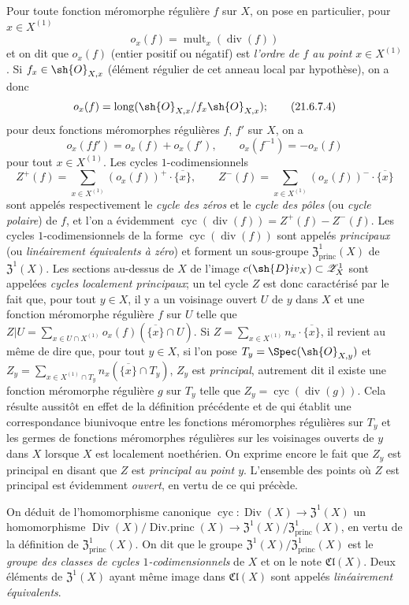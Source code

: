 \begin{env}[21.6.7]
Pour toute fonction méromorphe régulière $f$ sur $X$, on pose en particulier, pour $x\in X^{(1)}$
\[
\label{IV.21.6.7.3}
  o_x(f)=\operatorname{mult}_x(\operatorname{div}(f))
  \tag{21.6.7.3}
\]
et on dit que $o_x(f)$ (entier positif ou négatif) est \emph{l'ordre de $f$ au point} $x\in X^{(1)}$.
Si $f_x\in\sh{O}_{X,x}$ (élément régulier de cet anneau local par hypothèse), on a donc
\[
\label{IV.21.6.7.4}
  o_x(f)=\operatorname{long}(\sh{O}_{X,x}/f_x\sh{O}_{X,x});
  \tag{21.6.7.4}
\]
pour deux fonctions méromorphes régulières $f$, $f'$ sur $X$, on a
\[
\label{IV.21.6.7.5}
  o_x(ff')=o_x(f)+o_x(f'),\qquad o_x(f^{-1})=-o_x(f)
  \tag{21.6.7.5}
\]
pour tout $x\in X^{(1)}$.
Les cycles $1$-codimensionnels
\[
  Z^+(f)=\sum_{x\in X^{(1)}}(o_x(f))^+\cdot\overline{\{x\}},\qquad
  Z^-(f)=\sum_{x\in X^{(1)}}(o_x(f))^-\cdot\overline{\{x\}}
\]
sont appelés respectivement le \emph{cycle des zéros} et le \emph{cycle des pôles} (ou \emph{cycle polaire}) de $f$, et l'on a évidemment $\operatorname{cyc}(\operatorname{div}(f))=Z^+(f)-Z^-(f)$.
Les cycles $1$-codimensionnels de la forme $\operatorname{cyc}(\operatorname{div}(f))$ sont appelés \emph{principaux} (ou \emph{linéairement équivalents à zéro}) et forment un sous-groupe $\mathfrak{Z}^1_\mathrm{princ}(X)$ de $\mathfrak{Z}^1(X)$.
Les sections au-dessus de $X$ de l'image $c(\sh{D}iv_X)\subset\mathscr{Z}_X^1$ sont
appelées \emph{cycles localement principaux};
un tel cycle $Z$ est donc caractérisé par le fait que, pour tout $y\in X$, il y a un voisinage ouvert $U$ de $y$ dans $X$ et une fonction méromorphe régulière $f$ sur $U$ telle que $Z|U=\sum_{x\in U\cap X^{(1)}}o_x(f)(\overline{\{x\}}\cap U)$.
Si $Z=\sum_{x\in X^{(1)}}n_x\cdot\overline{\{x\}}$, il revient au même de dire que, pour tout $y\in X$, si l'on pose $T_y=\Spec(\sh{O}_{X,y})$ et $Z_y=\sum_{x\in X^{(1)}\cap T_y}n_x(\overline{\{x\}}\cap T_y)$, $Z_y$ est \emph{principal}, autrement dit il existe une fonction méromorphe régulière $g$ sur $T_y$ telle que $Z_y=\operatorname{cyc}(\operatorname{div}(g))$.
Cela résulte aussitôt en effet de la définition précédente et de  qui établit une correspondance biunivoque entre les fonctions méromorphes régulières sur $T_y$ et les germes de fonctions méromorphes régulières sur les voisinages ouverts de $y$ dans $X$ lorsque $X$ est localement noethérien.
On exprime encore le fait que $Z_y$ est principal en disant que $Z$ est \emph{principal au point $y$}.
L'ensemble des points où $Z$ est principal est évidemment \emph{ouvert}, en vertu de ce qui précède.

On déduit de l'homomorphisme canonique $\operatorname{cyc}:\operatorname{Div}(X)\to\mathfrak{Z}^1(X)$ un homomorphisme $\operatorname{Div}(X)/\operatorname{Div.princ}(X)\to\mathfrak{Z}^1(X)/\mathfrak{Z}^1_\mathrm{princ}(X)$, en vertu de la définition de $\mathfrak{Z}^1_\mathrm{princ}(X)$.
On dit que le groupe $\mathfrak{Z}^1(X)/\mathfrak{Z}^1_\mathrm{princ}(X)$ est le \emph{groupe des classes de cycles $1$-codimensionnels} de $X$ et on le note $\mathfrak{Cl}(X)$.
Deux éléments de $\mathfrak{Z}^1(X)$ ayant même image dans $\mathfrak{Cl}(X)$ sont appelés \emph{linéairement équivalents}.
\end{env}

